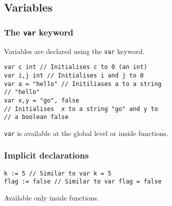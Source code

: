 \subsection{Variables}
\subsubsection{The \texttt{var} keyword}
Variables are declared using the \texttt{var} keyword.

\begin{lstlisting}
var c int // Initialises c to 0 (an int)
var i,j int // Initialises i and j to 0
var a = "hello" // Initiliases a to a string
// "hello"
var x,y = "go", false
// Initialises  x to a string "go" and y to 
// a boolean false
\end{lstlisting}

\texttt{var} is available at the global level or inside functions.

\subsubsection{Implicit declarations}
\begin{lstlisting}
k := 5 // Similar to var k = 5
flag := false // Similar to var flag = false
\end{lstlisting}

Available only inside functions.
